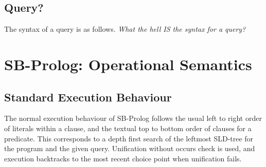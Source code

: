 \subsection{Query?}\label{query}
The syntax of a query is as follows.
{\em What the hell IS the syntax for a query?}

\section{SB-Prolog: Operational Semantics}

\subsection{Standard Execution Behaviour}

The normal execution behaviour of SB-Prolog follows the usual left to right
order of literals within a clause, and the textual top to bottom order of
clauses for a predicate.
This corresponds to a depth first search of the
leftmost SLD-tree for the program and the given query.
Unification without occurs check
 is used,
and execution backtracks to the most recent choice point when unification fails.

